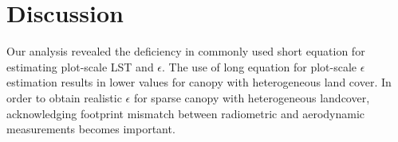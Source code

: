 \documentclass[fleqn,10pt]{wlscirep}
\begin{document}
\section{Discussion}

Our analysis revealed the deficiency in commonly used short equation for estimating plot-scale LST and $\epsilon$. The use of long equation for plot-scale $\epsilon$ estimation results in lower values for canopy with heterogeneous land cover. In order to obtain realistic $\epsilon$ for sparse canopy with heterogeneous landcover, acknowledging footprint mismatch between radiometric and aerodynamic measurements becomes important.
\end{document}
